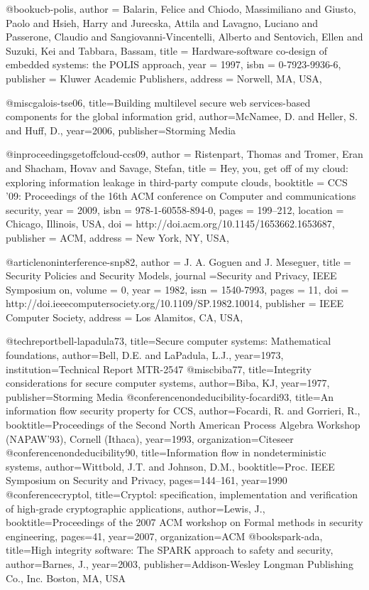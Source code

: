 @book{ucb-polis,
 author = {Balarin, Felice and Chiodo, Massimiliano and Giusto, Paolo and Hsieh, Harry and Jurecska, Attila and Lavagno, Luciano and Passerone, Claudio and Sangiovanni-Vincentelli, Alberto and Sentovich, Ellen and Suzuki, Kei and Tabbara, Bassam},
 title = {Hardware-software co-design of embedded systems: the POLIS approach},
 year = {1997},
 isbn = {0-7923-9936-6},
 publisher = {Kluwer Academic Publishers},
 address = {Norwell, MA, USA},
 }

@misc{galois-tse06,
  title={{Building multilevel secure web services-based components for the global information grid}},
  author={McNamee, D. and Heller, S. and Huff, D.},
  year={2006},
  publisher={Storming Media}
}


@inproceedings{getoffcloud-ccs09,
 author = {Ristenpart, Thomas and Tromer, Eran and Shacham, Hovav and Savage, Stefan},
 title = {Hey, you, get off of my cloud: exploring information leakage in third-party compute clouds},
 booktitle = {CCS '09: Proceedings of the 16th ACM conference on Computer and communications security},
 year = {2009},
 isbn = {978-1-60558-894-0},
 pages = {199--212},
 location = {Chicago, Illinois, USA},
 doi = {http://doi.acm.org/10.1145/1653662.1653687},
 publisher = {ACM},
 address = {New York, NY, USA},
 }
  
@article{noninterference-snp82,
author = {J. A. Goguen and J. Meseguer},
title = {Security Policies and Security Models},
journal ={Security and Privacy, IEEE Symposium on},
volume = {0},
year = {1982},
issn = {1540-7993},
pages = {11},
doi = {http://doi.ieeecomputersociety.org/10.1109/SP.1982.10014},
publisher = {IEEE Computer Society},
address = {Los Alamitos, CA, USA},
}

@techreport{bell-lapadula73,
  title={{Secure computer systems: Mathematical foundations}},
  author={Bell, D.E. and LaPadula, L.J.},
  year={1973},
  institution={Technical Report MTR-2547}
}
@misc{biba77,
  title={{Integrity considerations for secure computer systems}},
  author={Biba, KJ},
  year={1977},
  publisher={Storming Media}
}
@conference{nondeducibility-focardi93,
  title={{An information flow security property for CCS}},
  author={Focardi, R. and Gorrieri, R.},
  booktitle={Proceedings of the Second North American Process Algebra Workshop (NAPAW’93), Cornell (Ithaca)},
  year={1993},
  organization={Citeseer}
}
@conference{nondeducibility90,
  title={{Information flow in nondeterministic systems}},
  author={Wittbold, J.T. and Johnson, D.M.},
  booktitle={Proc. IEEE Symposium on Security and Privacy},
  pages={144--161},
  year={1990}
}
@conference{cryptol,
  title={{Cryptol: specification, implementation and verification of high-grade cryptographic applications}},
  author={Lewis, J.},
  booktitle={Proceedings of the 2007 ACM workshop on Formal methods in security engineering},
  pages={41},
  year={2007},
  organization={ACM}
}
@book{spark-ada,
  title={{High integrity software: The SPARK approach to safety and security}},
  author={Barnes, J.},
  year={2003},
  publisher={Addison-Wesley Longman Publishing Co., Inc. Boston, MA, USA}
}

